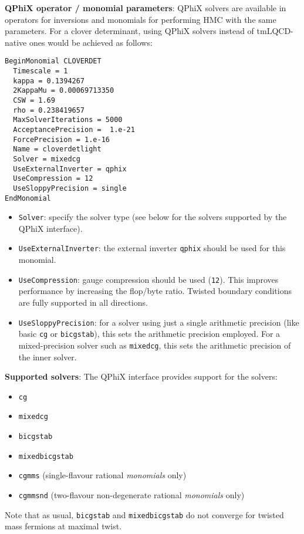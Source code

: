 \noindent\textbf{QPhiX operator / monomial parameters}: QPhiX solvers are available in operators for inversions and monomials for performing HMC with the same parameters.
For a clover determinant, using QPhiX solvers instead of tmLQCD-native ones would be achieved as follows:
\begin{framed}
\begin{Verbatim}
BeginMonomial CLOVERDET
  Timescale = 1
  kappa = 0.1394267
  2KappaMu = 0.00069713350
  CSW = 1.69
  rho = 0.238419657
  MaxSolverIterations = 5000
  AcceptancePrecision =  1.e-21
  ForcePrecision = 1.e-16
  Name = cloverdetlight
  Solver = mixedcg
  UseExternalInverter = qphix
  UseCompression = 12
  UseSloppyPrecision = single
EndMonomial  
\end{Verbatim}
\end{framed}
\begin{itemize}
  \item{\texttt{Solver}: specify the solver type (see below for the solvers supported by the QPhiX interface).} 
  \item{\texttt{UseExternalInverter}: the external inverter \texttt{qphix} should be used for this monomial.}
  \item{\texttt{UseCompression}: gauge compression should be used (\texttt{12}). This improves performance by increasing the flop/byte ratio. Twisted boundary conditions are fully supported in all directions.}
  \item{\texttt{UseSloppyPrecision}: for a solver using just a single arithmetic precision (like basic \texttt{cg} or \texttt{bicgstab}), this sets the arithmetic precision employed. For a mixed-precision solver such as \texttt{mixedcg}, this sets the arithmetic precision of the inner solver.}
\end{itemize}

\noindent\textbf{Supported solvers}: The QPhiX interface provides support for the solvers:
\begin{itemize}
\item{\texttt{cg}}
\item{\texttt{mixedcg}}
\item{\texttt{bicgstab}}
\item{\texttt{mixedbicgstab}}
\item{\texttt{cgmms} (single-flavour rational \emph{monomials} only)}
\item{\texttt{cgmmsnd} (two-flavour non-degenerate rational \emph{monomials} only)}
\end{itemize}
Note that as usual, \texttt{bicgstab} and \texttt{mixedbicgstab} do not converge for twisted mass fermions at maximal twist.

